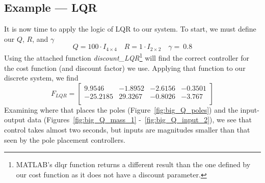 \FloatBarrier\subsection{Example --- LQR} %
It is now time to apply the logic of LQR to our system. To start, we must define our $Q$, $R$, and $\gamma$
\begin{equation}
    Q=100\cdot I_{4 \times 4} \quad R=1\cdot I_{2 \times 2} \quad \gamma=\ 0.8
    \label{eq:LQR_params_SMD}
\end{equation}
Using the attached function \textit{discount\_LQR}\footnote{MATLAB's dlqr function returns a different result than the one defined by our cost function as it does not have a discount parameter.} will find the correct controller for the cost function (and discount factor) we use. Applying that function to our discrete system, we find
\begin{equation}
    F_{LQR}=\left[\begin{matrix}9.9546&-1.8952&-2.6156&-0.3501\\-25.2185&29.3267&-0.8026&-3.767\\\end{matrix}\right]
    \label{eq:F_lqr}
\end{equation}
Examining where that places the poles (Figure~\ref{fig:big_Q_poles}) and the input-output data (Figures~\ref{fig:big_Q_mass_1} -~\ref{fig:big_Q_input_2}), we see that control takes almost two seconds, but inputs are magnitudes smaller than that seen by the pole placement controllers.

